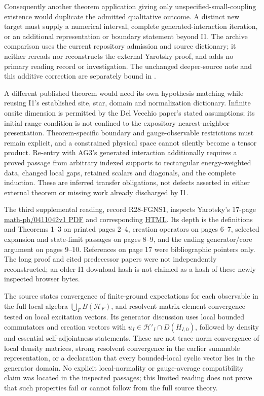 Consequently another theorem application giving only unspecified-small-coupling existence would duplicate the admitted qualitative outcome. A distinct new target must supply a numerical interval, complete generated-interaction iteration, or an additional representation or boundary statement beyond I1. The archive comparison uses the current repository admission and source dictionary; it neither rereads nor reconstructs the external Yarotsky proof, and adds no primary reading record or investigation. The unchanged deeper-source note and this additive correction are separately bound in .

A different published theorem would need its own hypothesis matching while reusing I1's established site, star, domain and normalization dictionary. Infinite onsite dimension is permitted by the Del Vecchio paper's stated assumptions; its initial range condition is not confined to the expository nearest-neighbor presentation. Theorem-specific boundary and gauge-observable restrictions must remain explicit, and a constrained physical space cannot silently become a tensor product. Re-entry with AG3's generated interaction additionally requires a proved passage from arbitrary indexed supports to rectangular energy-weighted data, changed local gaps, retained scalars and diagonals, and the complete induction. These are inferred transfer obligations, not defects asserted in either external theorem or missing work already discharged by I1.

The third supplemental reading, record R28-FGNS1, inspects Yarotsky's 17-page \href{https://arxiv.org/pdf/math-ph/0411042}{math-ph/0411042v1 PDF} and corresponding \href{https://arxiv.org/html/math-ph/0411042v1}{HTML}. Its depth is the definitions and Theorems 1--3 on printed pages 2--4, creation operators on pages 6--7, selected expansion and state-limit passages on pages 8--9, and the ending generator/core argument on pages 9--10. References on page 17 were bibliographic pointers only. The long proof and cited predecessor papers were not independently reconstructed; an older I1 download hash is not claimed as a hash of these newly inspected browser bytes.

The source states convergence of finite-ground expectations for each observable in the full local algebra $\bigcup_F B(\mathcal H_F)$, and resolvent matrix-element convergence tested on local excitation vectors. Its generator discussion uses local bounded commutators and creation vectors with $u_I\in\mathcal H'_I\cap D(H_{I,0})$, followed by density and essential self-adjointness statements. These are not trace-norm convergence of local density matrices, strong resolvent convergence in the earlier summable representation, or a declaration that every bounded-local cyclic vector lies in the generator domain. No explicit local-normality or gauge-average compatibility claim was located in the inspected passages; this limited reading does not prove that such properties fail or cannot follow from the full source theory.

